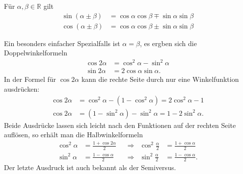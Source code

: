 \begin{satz}
Für $\alpha,\beta\in\mathbb{R}$ gilt
\begin{align*}
\sin(\alpha\pm\beta)
&=
\cos\alpha\cos\beta\mp\sin\alpha\sin\beta
\\
\cos(\alpha\pm\beta)
&=
\cos\alpha\cos\beta\pm\sin\alpha\sin\beta
\end{align*}
\end{satz}

Ein besonders einfacher Spezialfalls ist $\alpha=\beta$, es ergben sich die
Doppelwinkelformeln
\begin{align*}
\cos2\alpha &= \cos^2\alpha-\sin^2\alpha
\\
\sin2\alpha &= 2\cos\alpha\sin\alpha.
\end{align*}
In der Formel für $\cos2\alpha$ kann die rechte Seite durch nur
eine Winkelfunktion ausdrücken:
\begin{align*}
\cos2\alpha &= \cos^2\alpha - (1-\cos^2\alpha) = 2\cos^2\alpha -1
\\
\cos2\alpha &= (1-\sin^2\alpha) - \sin^2\alpha = 1-2\sin^2\alpha.
\end{align*}
Beide Ausdrücke lassen sich leicht nach den Funktionen auf der rechten
Seite auflösen, so erhält man die Halbwinkelformeln
\begin{align*}
\cos^2\alpha &= \frac{1+\cos2\alpha}2
&&\Rightarrow&
\cos^2\frac{\alpha}2 &=\frac{1+\cos\alpha}2
\\
\sin^2\alpha &= \frac{1-\cos\alpha}2
&&\Rightarrow&
\sin^2\frac{\alpha}2 &= \frac{1-\cos\alpha}2.
\end{align*}
Der letzte Ausdruck ist auch bekannt als der Semiversus.

